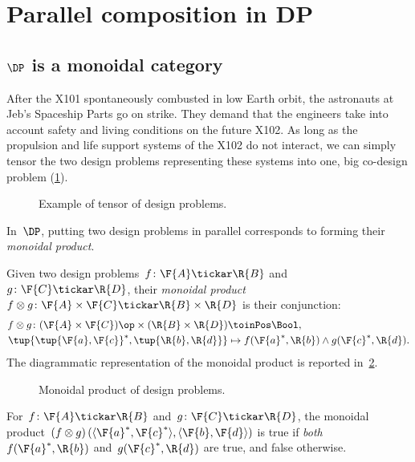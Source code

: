 \section{Parallel composition in DP}
\subsection{$\DP$ is a monoidal category}
\begin{example}
After the X101 spontaneously combusted in low Earth orbit, the astronauts at Jeb's Spaceship Parts go on strike. They demand that the engineers take into account safety and living conditions on the future X102. As long as the propulsion and life support systems of the X102 do not interact, we can simply tensor the two design problems representing these systems into one, big co-design problem (\cref{fig:examplemonoidal}).
\begin{figure}[h!]
\begin{center}
\end{center}
\caption{Example of tensor of design problems. \label{fig:examplemonoidal}}
\end{figure}
\end{example}
In~$\DP$, putting two design problems in parallel corresponds to forming their \emph{monoidal product}. 

\begin{definition}
\label{def:monoidalproduct}
Given two design problems~$f \colon \F{A} \tickar \R{B}$ and~$g \colon \F{C} \tickar \R{D}$,
their \emph{monoidal product}~$f\otimes g \colon \F{A} \times \F{C} \tickar \R{B} \times \R{D}$ is their conjunction:
\begin{equation}
\begin{aligned}
f \otimes g \colon (\F{A} \times \F{C})\op \times (\R{B} \times \R{D}) & \toinPos \Bool, \\
\tup{\tup{\F{a},\F{c}}^*,\tup{\R{b},\R{d}}} &\mapsto f(\F{a}^*,\R{b}) \wedge g(\F{c}^*,\R{d}). 
\end{aligned}
\end{equation}
The diagrammatic representation of the monoidal product is reported in~\cref{fig:dpmonoidal}.
\begin{figure}[h!]
\begin{center}
\end{center}
\caption{Monoidal product of design problems. \label{fig:dpmonoidal}}
\end{figure}
\end{definition}
\begin{remark}
For~$f \colon \F{A} \tickar \R{B}$ and~$g \colon \F{C} \tickar \R{D}$, the monoidal product~$\left(f \otimes g\right)(\langle \F{a}^*, \F{c}^*\rangle, \langle \F{b},\F{d} \rangle)$ is true if \emph{both}~$f(\F{a}^*,\R{b})$ and~$g(\F{c}^*,\R{d})$ are true, and false otherwise.
\end{remark}

